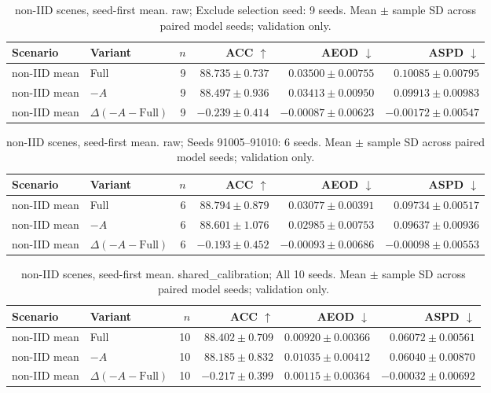 \begin{table}[t]
\centering
\small
\caption{non-IID scenes, seed-first mean. raw; Exclude selection seed: 9 seeds. Mean $\pm$ sample SD across paired model seeds; validation only.}
\begin{tabular}{llrrrr}
\toprule
Scenario & Variant & $n$ & ACC $\uparrow$ & AEOD $\downarrow$ & ASPD $\downarrow$ \\
\midrule
non-IID mean & Full & 9 & $88.735 \pm 0.737$ & $0.03500 \pm 0.00755$ & $0.10085 \pm 0.00795$ \\
non-IID mean & $-A$ & 9 & $88.497 \pm 0.936$ & $0.03413 \pm 0.00950$ & $0.09913 \pm 0.00983$ \\
non-IID mean & $\Delta(-A-\mathrm{Full})$ & 9 & $-0.239 \pm 0.414$ & $-0.00087 \pm 0.00623$ & $-0.00172 \pm 0.00547$ \\
\bottomrule
\end{tabular}
\end{table}

\begin{table}[t]
\centering
\small
\caption{non-IID scenes, seed-first mean. raw; Seeds 91005–91010: 6 seeds. Mean $\pm$ sample SD across paired model seeds; validation only.}
\begin{tabular}{llrrrr}
\toprule
Scenario & Variant & $n$ & ACC $\uparrow$ & AEOD $\downarrow$ & ASPD $\downarrow$ \\
\midrule
non-IID mean & Full & 6 & $88.794 \pm 0.879$ & $0.03077 \pm 0.00391$ & $0.09734 \pm 0.00517$ \\
non-IID mean & $-A$ & 6 & $88.601 \pm 1.076$ & $0.02985 \pm 0.00753$ & $0.09637 \pm 0.00936$ \\
non-IID mean & $\Delta(-A-\mathrm{Full})$ & 6 & $-0.193 \pm 0.452$ & $-0.00093 \pm 0.00686$ & $-0.00098 \pm 0.00553$ \\
\bottomrule
\end{tabular}
\end{table}

\begin{table}[t]
\centering
\small
\caption{non-IID scenes, seed-first mean. shared\_calibration; All 10 seeds. Mean $\pm$ sample SD across paired model seeds; validation only.}
\begin{tabular}{llrrrr}
\toprule
Scenario & Variant & $n$ & ACC $\uparrow$ & AEOD $\downarrow$ & ASPD $\downarrow$ \\
\midrule
non-IID mean & Full & 10 & $88.402 \pm 0.709$ & $0.00920 \pm 0.00366$ & $0.06072 \pm 0.00561$ \\
non-IID mean & $-A$ & 10 & $88.185 \pm 0.832$ & $0.01035 \pm 0.00412$ & $0.06040 \pm 0.00870$ \\
non-IID mean & $\Delta(-A-\mathrm{Full})$ & 10 & $-0.217 \pm 0.399$ & $0.00115 \pm 0.00364$ & $-0.00032 \pm 0.00692$ \\
\bottomrule
\end{tabular}
\end{table}

